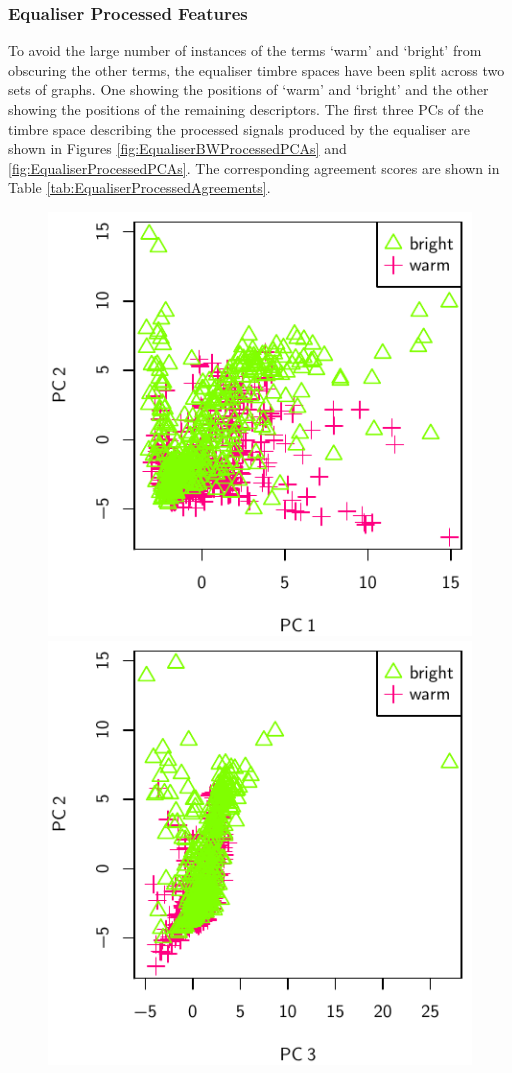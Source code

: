 		\subsubsection*{Equaliser Processed Features}
			To avoid the large number of instances of the terms `warm' and `bright' from obscuring the other
			terms, the equaliser timbre spaces have been split across two sets of graphs. One showing the
			positions of `warm' and `bright' and the other showing the positions of the remaining descriptors.
			The first three PCs of the timbre space describing the processed signals produced by the equaliser
			are shown in Figures \ref{fig:EqualiserBWProcessedPCAs} and \ref{fig:EqualiserProcessedPCAs}. The
			corresponding agreement scores are shown in Table \ref{tab:EqualiserProcessedAgreements}.

			\begin{figure}[h!]
				\centering
				\subfloat
				{
					\includegraphics{chapter4/Images/EqualiserBWProcessedPCA1-2.pdf}
					\label{fig:EqualiserProcessedPCA1-2}
				}
				\quad
				\subfloat
				{
					\includegraphics{chapter4/Images/EqualiserBWProcessedPCA3-2.pdf}
}
\end{figure}
